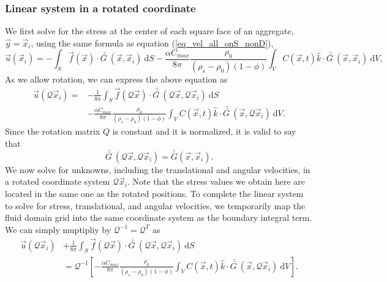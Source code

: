 \subsubsection{Linear system in a rotated coordinate}
We first solve for the stress at the center of each square face of an aggregate, $\vec{y} = \vec{x}_i$, 
using the same formula as equation (\ref{eq_vel_all_onS_nonD}),
\begin{equation}
	\vec{u} \left(\vec{x}_i \right) 
		  = -\int_{S}  
		 \vec{f}(\vec{x}) 
		 \cdot \bar{\bar{G \ }} (\vec{x}, \vec{x}_i) 
		 \ \textrm{d}S 
		 - \frac{ \alpha C_{max}}{8\pi } \frac{\rho_0}{(\rho_s - \rho_0)(1-\phi)}
		 \int_V  C \left(\vec{x} ,t \right) \hat{k} \cdot
		 \bar{\bar{G \ }}(\vec{x}, \vec{x}_i)
		 \ \text{d}V,
		 \nonumber
\end{equation}
As we allow rotation, we can express the above equation as
\begin{align}
	\vec{u} \left(\mathcal{Q} \vec{x}_i \right) 
		  = & - \frac{1}{8 \pi} \int_{S}  
		 \vec{f}(\mathcal{Q} \vec{x}) 
		 \cdot \bar{\bar{G \ }} (\mathcal{Q} \vec{x},\mathcal{Q}\vec{x}_i) 
		 \ \textrm{d}S
		 \nonumber \\
		 & - \frac{ \alpha C_{max}}{8\pi } \frac{\rho_0}{(\rho_s - \rho_0)(1-\phi)}
		 \int_V  C \left(\vec{x} ,t \right) \hat{k} \cdot
		 \bar{\bar{G \ }}(\vec{x}, \mathcal{Q} \vec{x}_i)
		 \ \text{d}V.
	\label{eq_slp_On_rotate}
\end{align}
Since the rotation matrix $Q$ is constant and it is normalized, it is valid to say that
\[
 \bar{\bar{G \ }} (\mathcal{Q} \vec{x},\mathcal{Q}\vec{x}_i) 
	 = \bar{\bar{G}}( \vec{x}, \vec{x}_i).
\]
We now solve for unknowns, including the translational and angular velocities,
in a rotated coordinate system $\mathcal{Q} \vec{x}_i $.
Note that the stress values we obtain here 
are located in the same one as the rotated positions.  
To complete the linear system to solve for stress, translational, and angular velocities, we temporarily map the fluid domain grid into the same coordinate system as the boundary integral term.
We can simply muptipliy by $\mathcal{Q}^{-1} = \mathcal{Q}^{T}$ as 
\begin{align}
	\vec{u} \left(\mathcal{Q} \vec{x}_i \right) 
		  & + \frac{1}{8 \pi} \int_{S}  
		 \vec{f}(\mathcal{Q} \vec{x}) 
		 \cdot \bar{\bar{G \ }} (\mathcal{Q} \vec{x},\mathcal{Q}\vec{x}_i) 
		 \ \textrm{d}S
		 \nonumber \\ & =
		 \mathcal{Q}^{-1}
		 \left[
		 - \frac{ \alpha C_{max}}{8\pi } \frac{\rho_0}{(\rho_s - \rho_0)(1-\phi)}
		 \int_V  C \left(\vec{x} ,t \right) \hat{k} \cdot
		 \bar{\bar{G \ }}(\vec{x}, \mathcal{Q} \vec{x}_i)
		 \ \text{d}V
		 \right].
	\label{eq_slp_vol_R}
\end{align}
